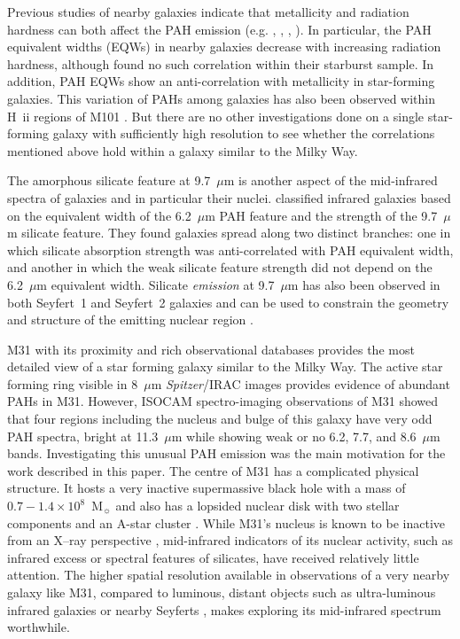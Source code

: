 Previous studies of nearby galaxies indicate that metallicity and radiation hardness can both affect the PAH emission (e.g. \citealt{Madden:00}, \citealt{Beirao:06}, \citealt{Engelbracht_2008}, \citealt{Munoz:09}). In particular, the PAH equivalent widths (EQWs) in nearby galaxies decrease with increasing radiation hardness, although \citet{Brandl2006} found no such correlation within their starburst sample. In addition, PAH EQWs show an anti-correlation with metallicity in star-forming galaxies. This variation of PAHs among galaxies has also been observed within H~{\sc ii} regions 
of M101 \citep{Gordon:2008lr}. But there are no other investigations done on a single star-forming galaxy with sufficiently high resolution to see whether the correlations mentioned above hold within a galaxy similar to the Milky Way.

The amorphous silicate feature at 9.7~$\mu$m is another aspect of the mid-infrared spectra of galaxies and in particular their nuclei.  \citet{Spoon2007} 
classified infrared galaxies based on the equivalent width of the 6.2~$\mu$m PAH feature and the strength of the 9.7~$\mu$m silicate feature. 
They  found galaxies spread along two distinct branches: one in which silicate absorption strength was anti-correlated with PAH
equivalent width, and another in which the weak silicate feature strength did not depend on the 6.2~$\mu$m equivalent width.
Silicate {\em emission} at 9.7~$\mu$m has also been observed in both Seyfert~1 and Seyfert~2 galaxies 
and can be used to constrain the geometry and structure of the emitting nuclear region \citep{Mason2009}.



M31 with its proximity \citep[$785\pm25$ kpc; ][]{Mcc2005} and rich observational databases provides the most detailed view of a star forming galaxy similar 
to the Milky Way. The active star forming ring visible in 8~$\mu$m  {\em Spitzer}/IRAC images \citep{Barmby2006lr} provides evidence of abundant PAHs in M31. 
However, ISOCAM spectro-imaging observations of M31\citep{1998Cesarsky} showed that four regions including the nucleus and bulge 
of this galaxy have very odd PAH spectra, bright at 11.3~$\mu$m while showing weak or no  6.2, 7.7, and 8.6~$\mu$m bands. 
Investigating this unusual PAH emission was the main motivation for the work described in this paper. 
The centre of M31 has a complicated physical structure. It hosts a very inactive supermassive black hole with a mass of 
$0.7-1.4 \times 10^8$~M$_{\sun}$ \citep{Bacon2001, Bender2005} and also has a lopsided nuclear disk  with two stellar 
components \citep{Lauer1993} and an A-star cluster \citep{Bender2005}. While M31's nucleus is known to be inactive from an 
X--ray perspective \citep{Li2011}, mid-infrared indicators of its nuclear activity, such
as infrared excess or spectral features of silicates,  have received relatively little attention. 
The higher spatial resolution available in observations of  a very nearby galaxy like M31, compared to 
luminous, distant objects such as ultra-luminous infrared galaxies \citep{Spoon2007} or nearby Seyferts \citep{Mason2009},
makes exploring its mid-infrared spectrum worthwhile.



